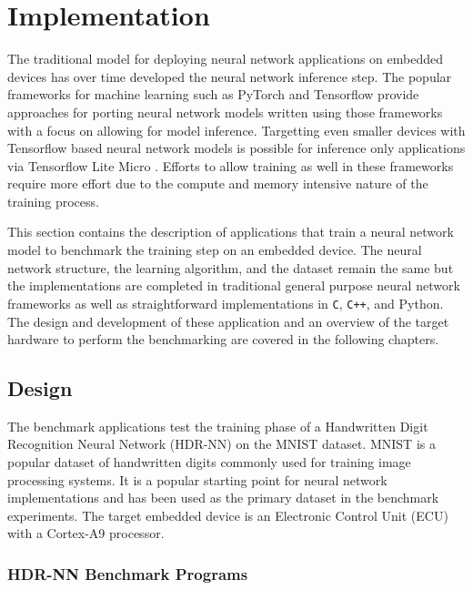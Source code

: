 \part{Implementation}

The traditional model for deploying neural network applications on embedded devices has over time developed the neural network inference step. The popular frameworks for machine learning such as PyTorch and Tensorflow provide approaches for porting neural network models written using those frameworks with a focus on allowing for model inference. Targetting even smaller devices with Tensorflow based neural network models is possible for inference only applications via Tensorflow Lite Micro \cite{tflm}. Efforts to allow training as well in these frameworks require more effort due to the compute and memory intensive nature of the training process.

This section contains the description of applications that train a neural network model to benchmark the training step on an embedded device. The neural network structure, the learning algorithm, and the dataset remain the same but the implementations are completed in traditional general purpose neural network frameworks as well as straightforward implementations in \texttt{C}, \texttt{C++}, and Python. The design and development of these application and an overview of the target hardware to perform the benchmarking are covered in the following chapters.


\chapter{Design}

The benchmark applications test the training phase of a Handwritten Digit Recognition Neural Network (HDR-NN) on the MNIST \cite{mnist} dataset. MNIST is a popular dataset of handwritten digits commonly used for training image processing systems. It is a popular starting point for neural network implementations and has been used as the primary dataset in the benchmark experiments. The target embedded device is an Electronic Control Unit (ECU) with a Cortex-A9 processor.

\section[Handwritten Digit Recognition (HDR)]{HDR-NN Benchmark Programs}

